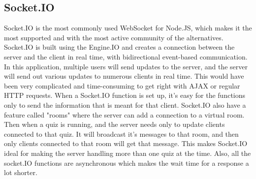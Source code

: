 \subsection{Socket.IO}
Socket.IO\cite{socketio} is the most commonly used WebSocket\cite{websocket} for Node.JS, which makes it the most supported and with the most active community of the alternatives. Socket.IO is built using the Engine.IO and creates a connection between the server and the client in real time, with bidirectional event-based communication. In this application, multiple users will send updates to the server, and the server will send out various updates to numerous clients in real time. This would have been very complicated and time-consuming to get right with AJAX or regular HTTP requests. When a Socket.IO function is set up, it's easy for the functions only to send the information that is meant for that client. Socket.IO also have a feature called "rooms" where the server can add a connection to a virtual room. Then when a quiz is running, and the server needs only to update clients connected to that quiz. It will broadcast it's messages to that room, and then only clients connected to that room will get that message. This makes Socket.IO ideal for making the server handling more than one quiz at the time. Also, all the socket.IO functions are asynchronous which makes the wait time for a response a lot shorter.

